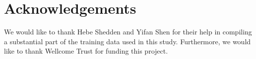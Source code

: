 \documentclass[10.7pt,]{article}
\begin{document}
%
%
%
%
%


\section{Acknowledgements}\label{acknowledgements}
We would like to thank Hebe Shedden and Yifan Shen for their help in compiling a substantial part of the training data used in this study. Furthermore, we would like to thank Wellcome Trust for funding this project.




\end{document}
